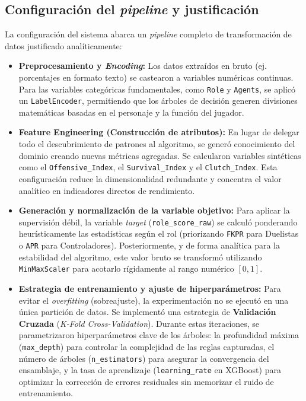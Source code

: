 \documentclass{ULBreport} %
\begin{document}
\subsection{Configuración del \textit{pipeline} y justificación}

La configuración del sistema abarca un \textit{pipeline} completo de transformación de datos justificado analíticamente:

\begin{itemize}
    \item \textbf{Preprocesamiento y \textit{Encoding}:} Los datos extraídos en bruto (ej. porcentajes en formato texto) se castearon a variables numéricas continuas. Para las variables categóricas fundamentales, como \texttt{Role} y \texttt{Agents}, se aplicó un \texttt{LabelEncoder}, permitiendo que los árboles de decisión generen divisiones matemáticas basadas en el personaje y la función del jugador.
    
    \item \textbf{Feature Engineering (Construcción de atributos):} En lugar de delegar todo el descubrimiento de patrones al algoritmo, se generó conocimiento del dominio creando nuevas métricas agregadas. Se calcularon variables sintéticas como el \texttt{Offensive\_Index}, el \texttt{Survival\_Index} y el \texttt{Clutch\_Index}. Esta configuración reduce la dimensionalidad redundante y concentra el valor analítico en indicadores directos de rendimiento.
    
    \item \textbf{Generación y normalización de la variable objetivo:} Para aplicar la supervisión débil, la variable \textit{target} (\texttt{role\_score\_raw}) se calculó ponderando heurísticamente las estadísticas según el rol (priorizando \texttt{FKPR} para Duelistas o \texttt{APR} para Controladores). Posteriormente, y de forma analítica para la estabilidad del algoritmo, este valor bruto se transformó utilizando \texttt{MinMaxScaler} para acotarlo rígidamente al rango numérico $[0,1]$. 
    
    \item \textbf{Estrategia de entrenamiento y ajuste de hiperparámetros:} Para evitar el \textit{overfitting} (sobreajuste), la experimentación no se ejecutó en una única partición de datos. Se implementó una estrategia de \textbf{Validación Cruzada} (\textit{K-Fold Cross-Validation}). Durante estas iteraciones, se parametrizaron hiperparámetros clave de los árboles: la profundidad máxima (\texttt{max\_depth}) para controlar la complejidad de las reglas capturadas, el número de árboles (\texttt{n\_estimators}) para asegurar la convergencia del ensamblaje, y la tasa de aprendizaje (\texttt{learning\_rate} en XGBoost) para optimizar la corrección de errores residuales sin memorizar el ruido de entrenamiento.


\end{itemize}
\end{document}
